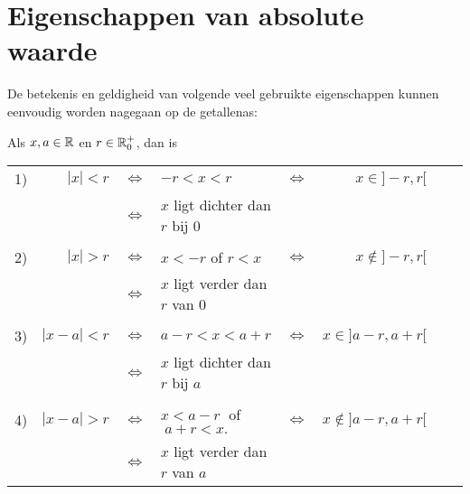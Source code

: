 \documentclass[numbers,wordchoicegiven]{ximera}
\begin{document}
\section{Eigenschappen van absolute waarde}
De betekenis en geldigheid van volgende veel gebruikte eigenschappen kunnen eenvoudig worden nagegaan op de getallenas:
\begin{proposition}\label{basisaw}
	Als $x,a \in \mathbb{R}$ en $r\in\mathbb{R}^+_0$, dan is 

	\begin{tabular}{lrclrrrr} 
	1)&$|x|<r$   &$\Leftrightarrow$ &$-r<x<r$  & $\Leftrightarrow$ & $x\in]-r,r[$     \\ & & $\Leftrightarrow$&$x$ ligt dichter dan $r$ bij $0$    \\
	\\
	2)&$|x|>r$   &$\Leftrightarrow$ &$x<-r$ of $r<x$ & $\Leftrightarrow$ & $x\notin]-r,r[$   
	\\ & & $\Leftrightarrow$ &$x$ ligt verder dan $r$ van $0$    \\
	\\
	3)&$|x-a|<r$ & $\Leftrightarrow$ & $ a-r<x<a+r$  & $\Leftrightarrow$ & $x\in]a-r,a+r[$ 
	\\ & & $\Leftrightarrow$ & $x$ ligt dichter dan $r$ bij $a$           \\
	\\
	4)&$|x-a|>r$ & $\Leftrightarrow$ & $ x<a-r\;$ of $\;a+r<x.$  & $\Leftrightarrow$ & $x\notin]a-r,a+r[$  
	\\ & & $\Leftrightarrow$ & $x$ ligt verder dan $r$ van $a$\\
	\end{tabular}        
\end{proposition}
\end{document}
